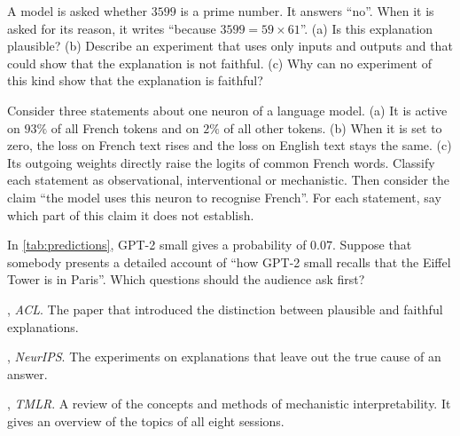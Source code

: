 \begin{exercise}\label{ex:plausible}
A model is asked whether $3599$ is a prime number. It answers ``no''. When it is asked for its reason, it writes
``because $3599=59\times61$''. (a) Is this explanation plausible? (b) Describe an experiment that uses only inputs
and outputs and that could show that the explanation is not faithful. (c) Why can no experiment of this kind show
that the explanation is faithful?
\end{exercise}

\begin{exercise}\label{ex:evidence}
Consider three statements about one neuron of a language model. (a) It is active on $93\%$ of all French tokens
and on $2\%$ of all other tokens. (b) When it is set to zero, the loss on French text rises and the loss on English
text stays the same. (c) Its outgoing weights directly raise the logits of common French words. Classify each
statement as observational, interventional or mechanistic. Then consider the claim ``the model uses this neuron to
recognise French''. For each statement, say which part of this claim it does not establish.
\end{exercise}

\begin{exercise}\label{ex:behaviour}
In \cref{tab:predictions}, GPT-2 small gives  a probability of $0.07$. Suppose that somebody presents
a detailed account of ``how GPT-2 small recalls that the Eiffel Tower is in Paris''. Which questions should the
audience ask first?
\end{exercise}

\begin{readinglist}
\item \citet{jacovi2020towards}, \emph{ACL}. The paper that introduced the distinction between plausible and
faithful explanations.
\item \citet{turpin2023language}, \emph{NeurIPS}. The experiments on explanations that leave out the true cause of
an answer.
\item \citet{bereska2024mechanistic}, \emph{TMLR}. A review of the concepts and methods of mechanistic
interpretability. It gives an overview of the topics of all eight sessions.
\end{readinglist}
